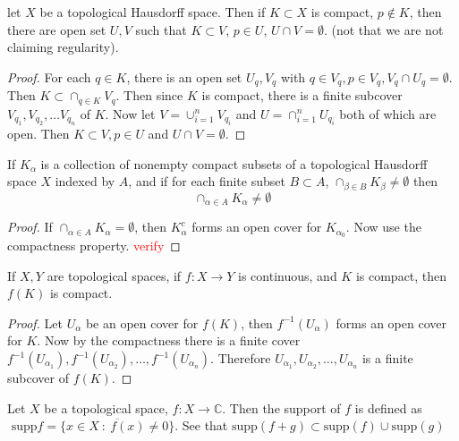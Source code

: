 \begin{theorem}
  let $X$ be a topological Hausdorff space. Then if $K \subset X$ is compact, $p \notin K$, then there are open set $U, V$ such that $K \subset V$, $p \in U$, $U \cap V = \emptyset$. (not that we are not claiming regularity).
\end{theorem}
\begin{proof}
  For each $q \in K$, there is an open set $U_q, V_q$ with $q \in V_q, p \in V_q, V_q \cap U_q = \emptyset$. Then $K \subset \cap_{q \in K}V_q$. Then since $ K$ is compact, there is a finite subcover $V_{q_1} , V_{q_2} , \ldots V_{q_n}$ of $K$. Now let $V = \cup_{i = 1}^{n}V_{q_i}$ and $U = \cap_{i = 1}^{n}U_{q_i}$ both of which are open. Then $K \subset V, p \in U$ and $U \cap V = \emptyset$.
\end{proof}

\begin{theorem}
   If $K_\alpha$ is a collection of nonempty compact subsets of a topological Hausdorff space $X$ indexed by $ A$, and if for each finite subset $B \subset A$, $\cap_{\beta \in  B}K_{\beta} \neq \emptyset$ then  \[
      \cap_{\alpha \in  A}K_\alpha \neq \emptyset
   \]
\end{theorem}
\begin{proof}
  If $\cap_{\alpha \in  A}K_\alpha = \emptyset$, then $K_\alpha^c$ forms an open cover for $K_{\alpha_0}$. Now use the compactness property. \textcolor{red}{verify}
\end{proof}

\begin{theorem}
  If $X, Y$ are topological spaces, if $f: X \to Y$ is continuous, and $K$ is compact, then $f(K)$ is compact.
\end{theorem}
\begin{proof}
  Let $U_\alpha$ be an open cover for $f(K)$, then $f^{-1}(U_\alpha)$ forms an open cover for $K$. Now by the compactness there is a finite cover $f^{-1}(U_{\alpha_1}), f^{-1}(U_{\alpha_2}), \ldots , f^{-1}(U_{\alpha_n})$. Therefore $U_{\alpha_1} , U_{\alpha_2} , \ldots , U_{\alpha_n}$ is a finite subcover of $f(K)$.
\end{proof}

\begin{definition}
  Let $X$ be a topological space, $f: X \to \mathbb{C}$. Then the support of $f$ is defined as $\textrm{  supp} f = \overline{\{ x \in X  \ : \  f(x) \neq 0 \}}$. 
  See that $\textrm{supp}(f+g) \subset \textrm{supp}(f) \cup \textrm{supp}(g)$
\end{definition}

